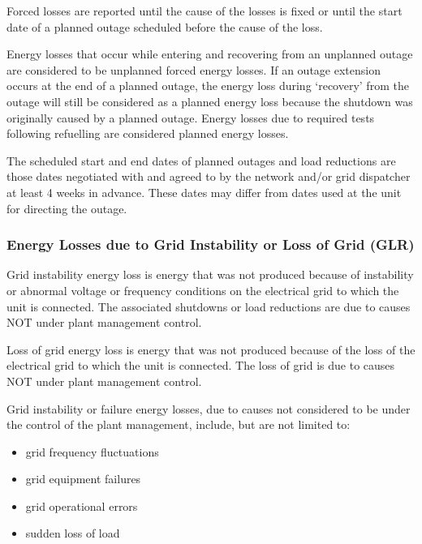 Forced losses are reported until the cause of the losses is fixed or
until the start date of a planned outage scheduled before the cause of
the loss.

Energy losses that occur while entering and recovering from an
unplanned outage are considered to be unplanned forced energy
losses. If an outage extension occurs at the end of a planned outage,
the energy loss during ‘recovery’ from the outage will still be
considered as a planned energy loss because the shutdown was
originally caused by a planned outage. Energy losses due to required
tests following refuelling are considered planned energy losses.

The scheduled start and end dates of planned outages and load
reductions are those dates negotiated with and agreed to by the
network and/or grid dispatcher at least 4 weeks in advance. These
dates may differ from dates used at the unit for directing the outage.

\subsubsection{Energy Losses due to Grid Instability or Loss of Grid
  (GLR)}

Grid instability energy loss is energy that was not produced because
of instability or abnormal voltage or frequency conditions on the
electrical grid to which the unit is connected. The associated
shutdowns or load reductions are due to causes NOT under plant
management control.

Loss of grid energy loss is energy that was not produced because of
the loss of the electrical grid to which the unit is connected. The
loss of grid is due to causes NOT under plant management control.

Grid instability or failure energy losses, due to causes not
considered to be under the control of the plant management, include,
but are not limited to:
\begin{itemize}
\item grid frequency fluctuations
\item grid equipment failures
\item grid operational errors
\item sudden loss of load
\end{itemize}

